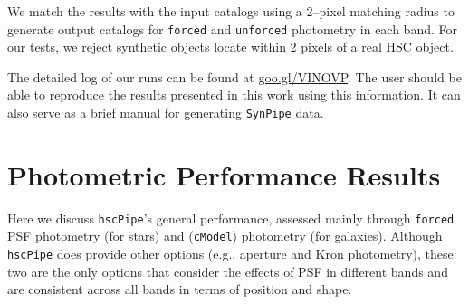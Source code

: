\documentclass[useamsfonts]{pasj01}
\def\hscpipe{\texttt{hscPipe}}
\def\synpipe{\texttt{SynPipe}}
\def\cmodel{\texttt{cModel}}
\def\forced{\texttt{forced}}
\def\unforced{\texttt{unforced}}
\begin{document}
    We match the results with the input catalogs using a 2--pixel matching radius
    to generate output catalogs for \forced{} and \unforced{} photometry
    in each band. For our tests, we reject  synthetic objects  locate within 2 pixels 
    of a real HSC object. 
    
    The detailed log of our runs can be found at \url{goo.gl/VINOVP}.
    The user should be able to reproduce the results presented in this work using 
    this information. It can also serve as a brief manual for generating \synpipe{} 
    data.


\section{Photometric Performance Results}
    \label{sec:result}

    Here we discuss \hscpipe{}'s general performance, assessed mainly through \forced{} 
    PSF photometry (for stars) and (\cmodel{}) photometry (for galaxies).
    Although \hscpipe{} does provide other options (e.g., aperture and Kron photometry),
    these two are the only options that consider the effects of PSF in different bands 
    and are consistent across all bands in terms of position and shape. 
    
\end{document}
